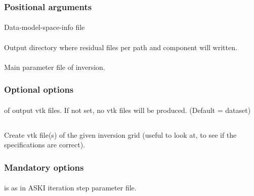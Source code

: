 \subsubsection{Positional arguments}
\paragraph{}
Data-model-space-info file
\paragraph{}
Output directory where residual files per path and component will written.
\paragraph{}
Main parameter file of inversion.
\subsubsection{Optional options}
\paragraph{}
 of output vtk files. If not set, no vtk files will be produced. (Default = dataset)
%
%
\subsection{} \label{programs_scripts,sec:bin_prog,sec:invgrid_vtk}
Create vtk file(s) of the given inversion grid (useful to look at, to see if the specifications are correct).

\subsubsection{Mandatory options}
\paragraph{}
 is  as in ASKI iteration step parameter file.
